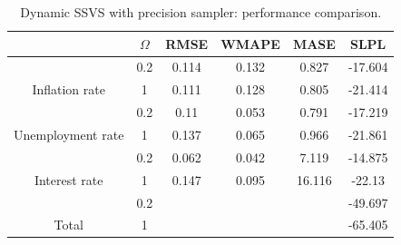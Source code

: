 \documentclass[
  12pt,
]{book}
\theoremstyle{break}
\theoremstyle{nonumberplain}
\begin{document}
\begin{table}[H]

\caption{\label{tab:mytab151}Dynamic SSVS with precision sampler: performance comparison.}
\centering
\begin{tabular}[t]{>{}cccccc}
\toprule
  & $\Omega$ & RMSE & WMAPE & MASE & SLPL\\
\midrule
 & 0.2 & 0.114 & 0.132 & 0.827 & -17.604\\
\cmidrule{2-6}
\multirow[t]{-2}{*}{\centering\arraybackslash Inflation rate} & 1 & 0.111 & 0.128 & 0.805 & -21.414\\
\cmidrule{1-6}
 & 0.2 & 0.11 & 0.053 & 0.791 & -17.219\\
\cmidrule{2-6}
\multirow[t]{-2}{*}{\centering\arraybackslash Unemployment rate} & 1 & 0.137 & 0.065 & 0.966 & -21.861\\
\cmidrule{1-6}
 & 0.2 & 0.062 & 0.042 & 7.119 & -14.875\\
\cmidrule{2-6}
\multirow[t]{-2}{*}{\centering\arraybackslash Interest rate} & 1 & 0.147 & 0.095 & 16.116 & -22.13\\
\cmidrule{1-6}
 & 0.2 &  &  &  & -49.697\\
\cmidrule{2-6}
\multirow[t]{-2}{*}{\centering\arraybackslash Total} & 1 &  &  &  & -65.405\\
\bottomrule
\end{tabular}
\end{table}
\end{document}
